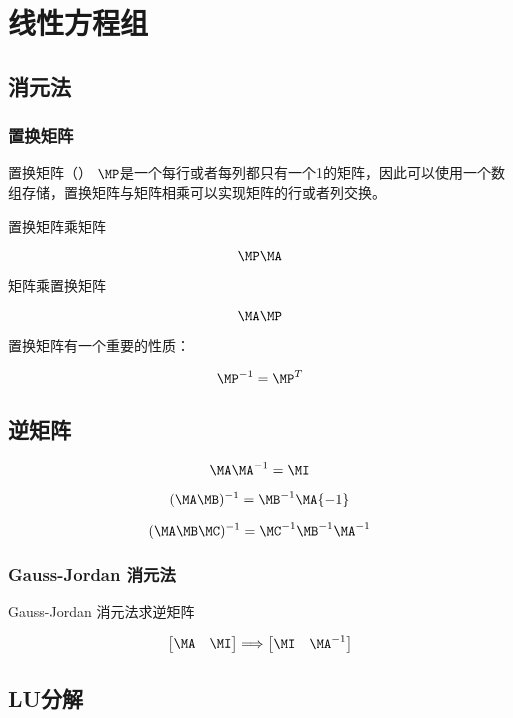 \chapter{线性方程组}

\section{消元法} 


\subsection{置换矩阵} 

置换矩阵（） $\MP$是一个每行或者每列都只有一个1的矩阵，因此可以使用一个数组存储，置换矩阵与矩阵相乘可以实现矩阵的行或者列交换。

 置换矩阵乘矩阵

$$\MP \MA$$

 矩阵乘置换矩阵

$$\MA \MP$$

置换矩阵有一个重要的性质：

$$\MP^{-1} = \MP^{T}$$

\section{逆矩阵}

$$\MA \MA^{-1} = \MI$$

$$(\MA \MB)^{-1} = \MB^{-1}\MA{-1}$$

$$(\MA \MB \MC)^{-1} = \MC^{-1}\MB^{-1}\MA^{-1}$$

\subsection{Gauss-Jordan 消元法}

Gauss-Jordan 消元法求逆矩阵

\begin{equation}
    \begin{bmatrix}
       \MA & \MI
    \end{bmatrix} 
    \Longrightarrow
    \begin{bmatrix}
        \MI & \MA^{-1}
    \end{bmatrix} 
\end{equation}

\section{LU分解}


